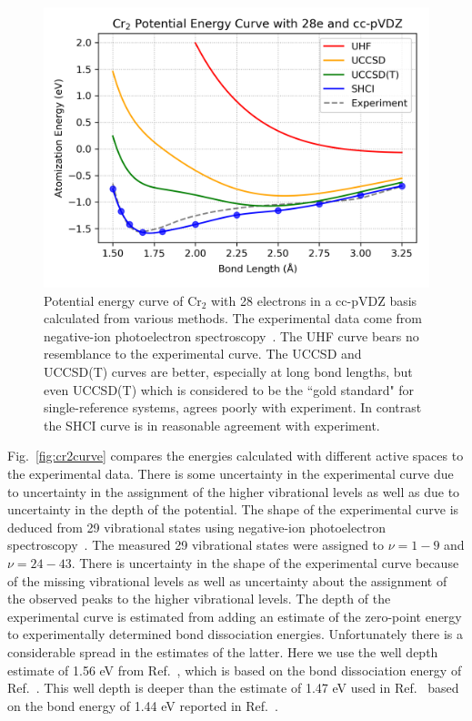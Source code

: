 \begin{figure}
  \begin{center}
  \includegraphics[width=0.9\linewidth]{figs/hfcc.png}
  \caption{Potential energy curve of Cr$_2$ with 28 electrons in a cc-pVDZ basis calculated from various methods.
  The experimental data come from negative-ion photoelectron spectroscopy~\cite{casey1993negative}.
  The UHF curve bears no resemblance to the experimental curve.
  The UCCSD and UCCSD(T) curves are better, especially at long bond lengths, but even UCCSD(T) which is considered to be the ``gold standard" for single-reference
  systems, agrees poorly with experiment.  In contrast the SHCI curve is in reasonable agreement with experiment.
}
  \label{fig:hfcc}
  \end{center}
\end{figure}

Fig.~\ref{fig:cr2curve} compares the energies calculated with different active spaces to the experimental data.
There is some uncertainty in the experimental curve due to uncertainty in the assignment of the higher vibrational levels
as well as due to uncertainty in the depth of the potential.
The shape of the experimental curve is deduced from 29 vibrational states using negative-ion photoelectron spectroscopy~\cite{casey1993negative}.
The measured 29 vibrational states were assigned to $\nu=1-9$ and $\nu=24-43$.
There is uncertainty in the shape of the experimental curve because of the missing vibrational levels as well as uncertainty
about the assignment of the observed peaks to the higher vibrational levels.
The depth of the experimental curve is estimated from adding an estimate of the zero-point energy
to experimentally determined bond dissociation energies.
Unfortunately there is a considerable spread in the estimates of the latter.
Here we use the well depth estimate of 1.56 eV from Ref.~\cite{VanMalVer-JCTC-16}, which is based on the bond dissociation
energy of Ref.~\cite{simard1998photoionization}.
This well depth is deeper than the estimate of 1.47 eV used in Ref.~\cite{GuoWatHuSunCha-JCTC-16} based on
the bond energy of 1.44 eV reported in Ref.~\cite{casey1993negative}.

